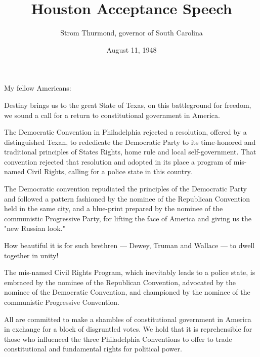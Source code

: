 \documentclass[10pt,a4paper]{article}
\begin{document}
\title{Houston Acceptance Speech}
\date{August 11, 1948}
\author{Strom Thurmond, governor of South Carolina}


\maketitle
    
\noindent\linenumbers My fellow Americans:

Destiny brings us to the great State of Texas, on this battleground for freedom, we sound a call for a return to constitutional government in America.

The Democratic Convention in Philadelphia rejected a resolution, offered by a distinguished Texan, to rededicate the Democratic Party to its time-honored and traditional principles of States Rights, home rule and local self-government. That convention rejected that resolution and adopted in its place a program of mis-named Civil Rights, calling for a police state in this country.

The Democratic convention repudiated the principles of the Democratic Party and followed a pattern fashioned by the nominee of the Republican Convention held in the same city, and a blue-print prepared by the nominee of the communistic Progressive Party, for lifting the face of America and giving us the "new Russian look."

How beautiful it is for such brethren — Dewey, Truman and Wallace — to dwell together in unity!

The mis-named Civil Rights Program, which inevitably leads to a police state, is embraced by the nominee of the Republican Convention, advocated by the nominee of the Democratic Convention, and championed by the nominee of the communistic Progressive Convention.

All are committed to make a shambles of constitutional government in America in exchange for a block of disgruntled votes. We hold that it is reprehensible for those who influenced the three Philadelphia Conventions to offer to trade constitutional and fundamental rights for political power.
\end{document}

